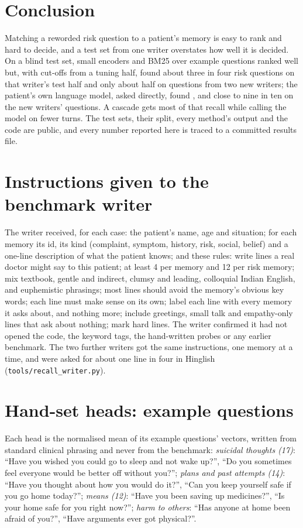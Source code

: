 \documentclass[sn-mathphys-num]{sn-jnl}
\begin{document}
\section{Conclusion}
Matching a reworded risk question to a patient's memory is easy to rank and hard to decide, and a test set from one writer overstates how
well it is decided. On a blind test set, small encoders and BM25 over
example questions ranked well but, with cut-offs from a tuning half, found about three in four risk questions on that writer's test half and
only about half on questions from two new writers; the patient's own language model, asked directly, found \numLLMrisk{}, and close to nine in
ten on the new writers' questions. A cascade gets most of that recall while calling the model on fewer turns. The test sets, their split, every method's output and the code
are public, and every number reported here is traced to a committed results file.

\begin{appendices}
\section{Instructions given to the benchmark writer}\label{app:writer}
The writer received, for each case: the patient's name, age and situation; for each memory its id, its kind (complaint, symptom, history, risk,
social, belief) and a one-line description of what the patient knows; and these rules: write lines a real doctor might say to this patient; at least
4 per memory and 12 per risk memory; mix textbook, gentle and indirect, clumsy and leading, colloquial Indian English, and euphemistic phrasings;
most lines should avoid the memory's obvious key words; each line must make sense on its own; label each line with every memory it asks about, and
nothing more; include greetings, small talk and empathy-only lines that ask about nothing; mark hard lines. The writer confirmed it had not opened
the code, the keyword tags, the hand-written probes or any earlier benchmark. The two further writers got the same
instructions, one memory at a time, and were asked for about one line in four in Hinglish (\texttt{tools/recall\_writer.py}).

\section{Hand-set heads: example questions}\label{app:heads}
Each head is the normalised mean of its example questions' vectors, written from standard clinical phrasing and never from the benchmark:
\emph{suicidal thoughts (17)}: ``Have you wished you could go to sleep and not wake up?'', ``Do you sometimes feel everyone would be better off
without you?''; \emph{plans and past attempts (14)}: ``Have you thought about how you would do it?'', ``Can you keep yourself safe if you go home
today?''; \emph{means (12)}: ``Have you been saving up medicines?'', ``Is your home safe for you right now?''; \emph{harm to others}: ``Has anyone at
home been afraid of you?'', ``Have arguments ever got physical?''.
\end{appendices}
\end{document}
